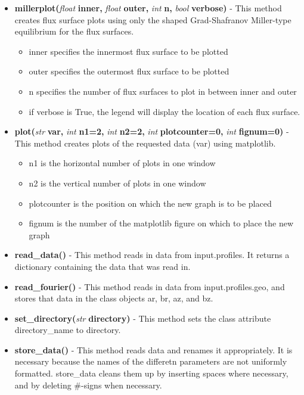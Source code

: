 \documentclass{article}
\begin{document}
\begin{itemize}
\begin{itemize}
\item \textbf{millerplot(}\emph{float}\textbf{ inner, }\emph{float}\textbf{ outer, }\emph{int}\textbf{ n, }\emph{bool}\textbf{ verbose)} - This method creates flux surface plots using only the shaped Grad-Shafranov Miller-type equilibrium for the flux surfaces.
\begin{itemize}
\item inner specifies the innermost flux surface to be plotted
\item outer specifies the outermost flux surface to be plotted
\item n specifies the number of flux surfaces to plot in between inner and outer
\item if verbose is True, the legend will display the location of each flux surface.
\end{itemize}
\item \textbf{plot(}\emph{str}\textbf{ var, }\emph{int}\textbf{ n1=2, }\emph{int}\textbf{ n2=2, }\emph{int}\textbf{ plotcounter=0, }\emph{int}\textbf{ fignum=0)} - This method creates plots of the requested data (var) using matplotlib.
\begin{itemize}
\item n1 is the horizontal number of plots in one window
\item n2 is the vertical number of plots in one window
\item plotcounter is the position on which the new graph is to be placed
\item fignum is the number of the matplotlib figure on which to place the new graph
\end{itemize}
\item \textbf{read\_data()} - This method reads in data from input.profiles.  It returns a dictionary containing the data that was read in.
\item \textbf{read\_fourier()} - This method reads in data from input.profiles.geo, and stores that data in the class objects ar, br, az, and bz.
\item \textbf{set\_directory(}\emph{str}\textbf{ directory)} - This method sets the class attribute directory\_name to directory.
\item \textbf{store\_data()} - This method reads data and renames it appropriately.  It is necessary because the names of the differetn parameters are not uniformly formatted.  store\_data cleans them up by inserting spaces where necessary, and by deleting \#-signs when necessary.
\end{itemize}
\end{itemize}
\end{document}
